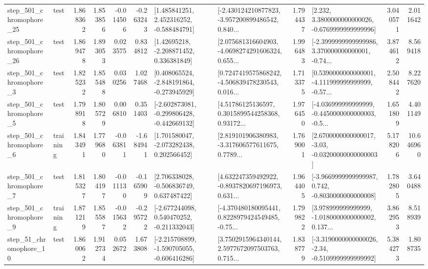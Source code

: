 \begin{tabular}{llrrrrllrlrr}
  step\_501\_chromophore\_25 &      test &      1.868362 &    1.853856 &     -0.014506 & -0.263243 &    [1.485841251, 2.452316252, -0.588484791] &  [-2.430124210877823, -3.957200899486542, 0.840... &       1.794437 &   [2.232, 3.3800000000000026, -0.6769999999999996] &            3.040571 &          2.011642 \\
  step\_501\_chromophore\_26 &      test &      1.869478 &    1.893053 &      0.023575 &  0.834812 &     [1.42695218, -2.208871452, 0.336381849] &  [2.075681316604903, -4.0698274291606324, 0.655... &       1.996483 &  [-2.3999999999999986, 3.370000000000001, -0.74... &            3.874612 &          8.569418 \\
   step\_501\_chromophore\_3 &      test &      1.825232 &    1.855488 &      0.030256 &  1.027468 &   [0.408065524, -2.848191864, -0.273945929] &  [0.7247419575868242, -4.506839478230543, 0.016... &       1.713375 &  [0.5390000000000001, -4.111999999999999, -0.57... &            2.508442 &          8.227620 \\
   step\_501\_chromophore\_5 &      test &      1.798918 &    1.805729 &      0.006810 &  0.351403 &  [-2.602873081, -0.299806428, -0.442669132] &  [4.51786125136597, 0.3015899544258368, 0.93172... &       1.976450 &  [-4.036999999999999, -0.4450000000000003, -0.5... &            1.651809 &          4.401149 \\
   step\_501\_chromophore\_6 &  training &      1.843491 &    1.779680 &     -0.063811 & -1.684941 &    [1.701580047, -2.073282438, 0.202566452] &  [2.819101906380983, -3.317606577611675, 0.7789... &       1.769001 &  [2.6700000000000017, -3.03, -0.03200000000000003] &            5.178206 &         10.646960 \\
   step\_501\_chromophore\_7 &      test &      1.815327 &    1.804197 &     -0.011130 & -0.165909 &    [2.706338028, -0.506836749, 0.637487422] &  [4.632247359492922, -0.8937820697196973, 0.631... &       1.964405 &  [-3.9669999999999987, 0.742, -0.8030000000000008] &            1.782805 &          3.640488 \\
   step\_501\_chromophore\_9 &  training &      1.871219 &    1.855587 &     -0.015632 & -0.295722 &   [-2.677244098, 0.540470252, -0.211332043] &  [-4.370480180095441, 0.8228979424549485, -0.75... &       1.799822 &  [3.978999999999999, -1.0180000000000002, 0.137... &            3.862953 &          8.518939 \\
   step\_51\_chromophore\_10 &      test &      1.860062 &    1.912734 &      0.052672 &  1.673808 &  [-2.215708899, -1.590705055, -0.606416286] &  [3.7502915964340144, 2.5977672097503763, 0.715... &       1.838779 &  [-3.3190000000000026, -2.34, -0.5109999999999992] &            5.384273 &          1.808735 \\

\end{tabular}
